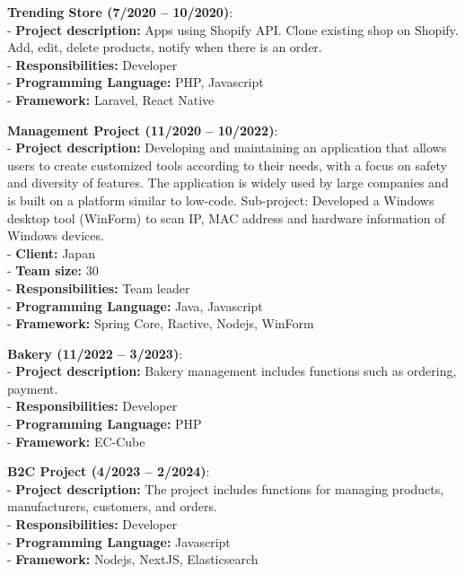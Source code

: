 \documentclass[letterpaper,11pt]{article}
\newcommand{\resumeItem}[2]{
  \item\small{
    \textbf{#1}{: #2 \vspace{-2pt}}
  }
}
\newcommand{\resumeSubItem}[2]{\resumeItem{#1}{#2}\vspace{4pt}}
\begin{document}
    \resumeSubItem{Trending Store (7/2020 -- 10/2020)}
      {\\
        - \textbf{Project description:}
            Apps using Shopify API. Clone existing shop on Shopify.
            Add, edit, delete products, notify when there is an order.\\
        - \textbf{Responsibilities:} Developer \\
        - \textbf{Programming Language:} PHP, Javascript \\
        - \textbf{Framework:} Laravel, React Native \\
      }
    \resumeSubItem{Management Project (11/2020 -- 10/2022)}
      {\\
        - \textbf{Project description:}
            Developing and maintaining an application that allows users to create customized tools
            according to their needs, with a focus on safety and diversity of features.
            The application is widely used by large companies and is built on a platform similar to low-code.
            Sub-project: Developed a Windows desktop tool (WinForm) to scan IP, MAC address and hardware information of Windows devices.\\
        - \textbf{Client:} Japan \\
        - \textbf{Team size:} 30 \\
        - \textbf{Responsibilities:} Team leader \\
        - \textbf{Programming Language:} Java, Javascript \\
        - \textbf{Framework:} Spring Core, Ractive, Nodejs, WinForm \\
      }
    \resumeSubItem{Bakery (11/2022 -- 3/2023)}
      {\\
        - \textbf{Project description:}
            Bakery management includes functions such as ordering, payment.\\
        - \textbf{Responsibilities:} Developer \\
        - \textbf{Programming Language:} PHP \\
        - \textbf{Framework:} EC-Cube \\
      }
    \resumeSubItem{B2C Project (4/2023 -- 2/2024)}
      {\\
        - \textbf{Project description:}
            The project includes functions for managing products, manufacturers, customers, and orders.\\
        - \textbf{Responsibilities:} Developer \\
        - \textbf{Programming Language:} Javascript \\
        - \textbf{Framework:} Nodejs, NextJS, Elasticsearch \\
      }
\end{document}
